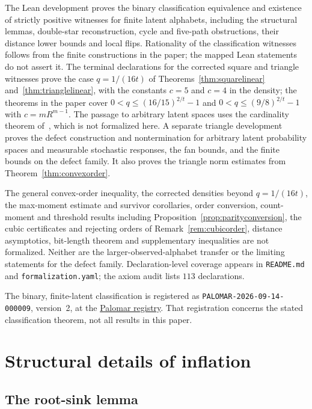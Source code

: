 \documentclass[11pt]{article}
\theoremstyle{plain}
\theoremstyle{definition}
\begin{document}
The Lean development proves the binary classification equivalence and existence of strictly positive witnesses for finite latent alphabets, including the structural lemmas, double-star reconstruction, cycle and five-path obstructions, their distance lower bounds and local flips. Rationality of the classification witnesses follows from the finite constructions in the paper; the mapped Lean statements do not assert it. The terminal declarations for the corrected square and triangle witnesses prove the case $q=1/(16t)$ of Theorems~\ref{thm:squarelinear} and~\ref{thm:trianglelinear}, with the constants $c=5$ and $c=4$ in the density; the theorems in the paper cover $0<q\le(16/15)^{2/t}-1$ and $0<q\le(9/8)^{2/t}-1$ with $c=mR^{m-1}$. The passage to arbitrary latent spaces uses the cardinality theorem of~\cite{RGW2018}, which is not formalized here. A separate triangle development proves the defect construction and nontermination for arbitrary latent probability spaces and measurable stochastic responses, the fan bounds, and the finite bounds on the defect family. It also proves the triangle norm estimates from Theorem~\ref{thm:convexorder}.

The general convex-order inequality, the corrected densities beyond $q=1/(16t)$, the max-moment estimate and survivor corollaries, order conversion, count-moment and threshold results including Proposition~\ref{prop:parityconversion}, the cubic certificates and rejecting orders of Remark~\ref{rem:cubicorder}, distance asymptotics, bit-length theorem and supplementary inequalities are not formalized. Neither are the larger-observed-alphabet transfer or the limiting statements for the defect family. Declaration-level coverage appears in \texttt{README.md} and \texttt{formalization.yaml}; the axiom audit lists $113$ declarations.

The binary, finite-latent classification is registered as \texttt{PALOMAR-2026-09-14-000009}, version~2, at the \href{https://palomar-registry.org/entry.html?id=PALOMAR-2026-09-14-000009&version=2}{Palomar registry}. That registration concerns the stated classification theorem, not all results in this paper.


\clearpage
\appendix
\section{Structural details of inflation}\label{app:structure}

\subsection{The root-sink lemma}\label{app:rootsink}
\end{document}
